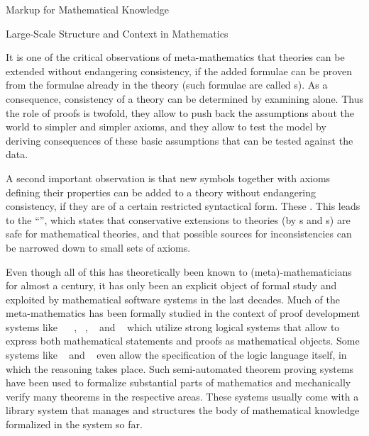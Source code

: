 \begin{omgroup}[id=math-markup]{Markup for Mathematical Knowledge}
\begin{module}[id=math-context]
\begin{omgroup}[id=meta-theories]{Large-Scale Structure and Context in Mathematics}
\begin{omtext}
  It is one of the critical observations of meta-mathematics that theories can be extended
  without endangering consistency, if the added formulae can be proven from the formulae
  already in the theory (such formulae are called {s}). As a
  consequence, consistency of a theory can be determined by examining  alone. Thus the role of proofs is
  twofold, they allow to push back the assumptions about the world to simpler and simpler
  axioms, and they allow to test the model by deriving consequences of these basic
  assumptions that can be tested against the data.
\end{omtext}

\begin{omtext}
  A second important observation is that new symbols together with axioms defining their
  properties can be added to a theory without endangering consistency, if they are of a
  certain restricted syntactical form. These .  This leads to the ``{\emph{}}'', which states that conservative extensions to
  theories (by {s} and {s}) are safe for
  mathematical theories, and that possible sources for inconsistencies
  can be narrowed down to small sets of axioms.
\end{omtext}

  Even though all of this has theoretically been known to (meta)-mathema\-ticians for
  almost a century, it has only been an explicit object of formal study and exploited by
  mathematical software systems in the last decades. Much of the meta-mathematics has been
  formally studied in the context of proof development systems like
  {\automath}~\cite{Bruijn80} {\nuprl}~\cite{Constable86}, {\hol}~\cite{GoMe93},
  {\mizar}~\cite{Rudnicki:aomp92} and {\OMEGA}~\cite{BenzmuellerEtAl:otama97} which
  utilize strong logical systems that allow to express both mathematical statements and
  proofs as mathematical objects.  Some systems like {\isabelle}~\cite{Paulson90} and
  {}~\cite{Pfenning91} even allow the specification of the logic language
  itself, in which the reasoning takes place.  Such semi-automated theorem proving systems
  have been used to formalize substantial parts of mathematics and mechanically verify
  many theorems in the respective areas. These systems usually come with a library system
  that manages and structures the body of mathematical knowledge formalized in the system
  so far.


\end{omgroup}
\end{module}
\end{omgroup}
